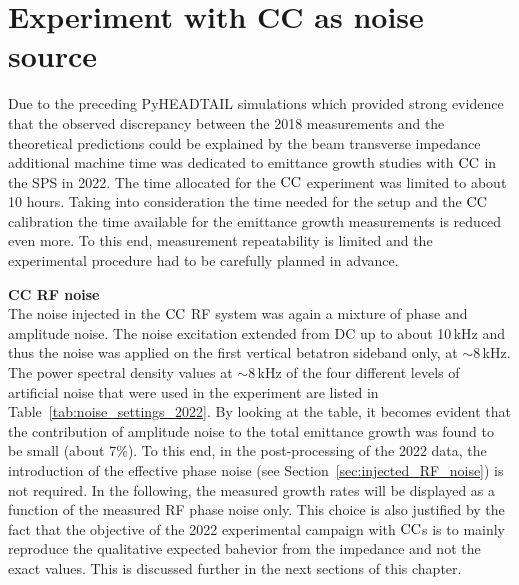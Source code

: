 \section{Experiment with CC as noise source}\label{sec:cc_md_2022}
Due to the preceding PyHEADTAIL simulations which provided strong evidence that the observed discrepancy between the 2018 measurements and the theoretical predictions could be explained by the beam transverse impedance additional machine time was dedicated to emittance growth studies with ${\mathrm{CC}}$ in the SPS in 2022. The time allocated for the ${\mathrm{CC}}$ experiment was limited to about 10 hours. Taking into consideration the time needed for the setup and the ${\mathrm{CC}}$ calibration the time available for the emittance growth measurements is reduced even more. To this end, measurement repeatability is limited and the experimental procedure had to be carefully planned in advance.





\textbf{CC RF noise}\\
The noise injected in the ${\mathrm{CC}}$ RF system was again a mixture of phase and amplitude noise. The noise excitation extended from DC up to about 10\,kHz and thus the noise was applied on the first vertical betatron sideband only, at $\sim$8\,kHz. The power spectral density values at $\sim$8\,kHz of the four different levels of artificial noise that were used in the experiment are listed in Table~\ref{tab:noise_settings_2022}. By looking at the table, it becomes evident that the contribution of amplitude noise to the total emittance growth was found to be small (about 7$\%$). To this end, in the post-processing of the 2022 data, the introduction of the effective phase noise (see Section~\ref{sec:injected_RF_noise}) is not required. In the following, the measured growth rates will be displayed as a function of the measured RF phase noise only. This choice is also justified by the fact that the objective of the 2022 experimental campaign with ${\mathrm{CC}}$s is to mainly reproduce the qualitative expected bahevior from the impedance and not the exact values. This is discussed further in the next sections of this chapter.


